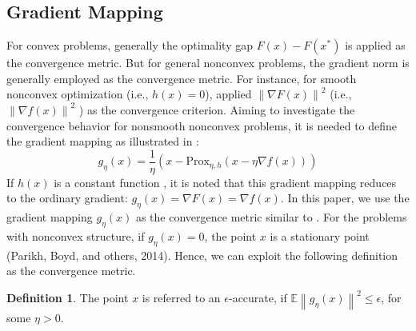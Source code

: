 \documentclass{article}
\newcommand*{\Po}{\text{Prox}}
\newcommand*{\E}{\mathbb{E}}
\newcommand{\norm}[1]{\left\lVert#1\right\rVert}
\theoremstyle{definition}
\newtheorem{definition}[theorem]{Definition}
\theoremstyle{remark}
\begin{document}
\subsection{Gradient Mapping}
For convex problems, generally the optimality gap $F(x) - F(x^*)$ is applied as the convergence metric. But for general nonconvex problems, the gradient norm is generally employed as the convergence metric. For instance, for smooth nonconvex optimization (i.e., $h(x) = 0$), \cite{ghadimi2013stochastic,reddi2016stochastic,
lei2017non,liu2018zeroth}  applied $\norm{\nabla F(x)}^2$ (i.e., $\norm{\nabla f(x)}^2$ ) as the convergence criterion. Aiming to investigate the
convergence behavior for nonsmooth nonconvex problems, it is needed to define the gradient mapping as illustrated in \cite{ghadimi2016accelerated,reddi2016proximal,huang2019faster}:
\begin{equation}
g_{\eta}(x) = \frac{1}{\eta}(x-\Po_{\eta,h}(x-\eta \nabla f(x)))
\end{equation}
If $h(x)$ is a constant function , it is noted that this gradient mapping reduces to the ordinary gradient:
$g_{\eta}(x) = \nabla F(x) = \nabla f(x)$. In this paper, we use the gradient mapping $g_{\eta}(x)$ as the convergence metric similar to
\cite{ghadimi2016accelerated,reddi2016proximal,parikh2014proximal}.
For the problems with nonconvex structure, if $g_{\eta}(x) = 0$, the point $x$ is a stationary point (Parikh, Boyd, and others, 2014). Hence, we can
exploit the following definition as the convergence metric.
\begin{definition}
The point $x$ is referred to an $\epsilon$-accurate, if $\E\norm{g_{\eta}(x)}^2 \leq \epsilon$, for some $\eta > 0$.
\end{definition}
\end{document}
